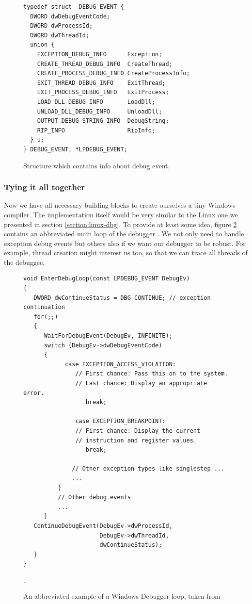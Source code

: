 \begin{figure}
\begin{verbatim}
typedef struct _DEBUG_EVENT {
  DWORD dwDebugEventCode;
  DWORD dwProcessId;
  DWORD dwThreadId;
  union {
    EXCEPTION_DEBUG_INFO      Exception;
    CREATE_THREAD_DEBUG_INFO  CreateThread;
    CREATE_PROCESS_DEBUG_INFO CreateProcessInfo;
    EXIT_THREAD_DEBUG_INFO    ExitThread;
    EXIT_PROCESS_DEBUG_INFO   ExitProcess;
    LOAD_DLL_DEBUG_INFO       LoadDll;
    UNLOAD_DLL_DEBUG_INFO     UnloadDll;
    OUTPUT_DEBUG_STRING_INFO  DebugString;
    RIP_INFO                  RipInfo;
  } u;
} DEBUG_EVENT, *LPDEBUG_EVENT;
\end{verbatim}
\caption{Structure which contains info about debug event.}
\label{fig:DebugEvent}
\end{figure}

\subsubsection*{Tying it all together}
Now we have all necessary building blocks to create ourselves a tiny Windows
compiler. The implementation itself would be very similar to the Linux one we
presented in section \ref{section:linux-dbg}. To provide at least some idea,
figure \ref{fig:windows-debugger-mainloop} contains an abbreviated main loop of
the debugger \cite{windows-msdn-dbg-main-loop}. We not only need to handle
exception debug events but others also if we want our debugger to be robust.
For example, thread creation might interest us too, so that we can trace all
threads of the debuggee.

\begin{figure}
    \begin{verbatim}
void EnterDebugLoop(const LPDEBUG_EVENT DebugEv)
{
   DWORD dwContinueStatus = DBG_CONTINUE; // exception continuation
   for(;;)
   {
      WaitForDebugEvent(DebugEv, INFINITE);
      switch (DebugEv->dwDebugEventCode)
      {
            case EXCEPTION_ACCESS_VIOLATION: 
               // First chance: Pass this on to the system.
               // Last chance: Display an appropriate error.
                  break;

               case EXCEPTION_BREAKPOINT:
               // First chance: Display the current
               // instruction and register values.
                  break;

              // Other exception types like singlestep ...
              ...
          }
          // Other debug events
          ...
      }
   ContinueDebugEvent(DebugEv->dwProcessId,
                      DebugEv->dwThreadId,
                      dwContinueStatus);
   }
}
    \end{verbatim}
    \caption{An abbreviated example of a Windows Debugger loop, taken from~\cite{windows-msdn-dbg-main-loop}}.
    \label{fig:windows-debugger-mainloop}
\end{figure}

